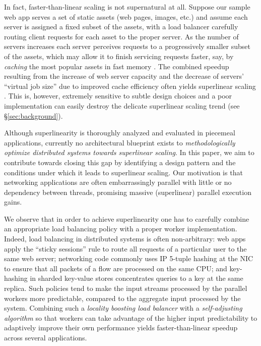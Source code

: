 In fact, faster-than-linear scaling is not supernatural at all. Suppose our sample web app serves a set of static assets (web pages, images, etc.) and assume each server is assigned a fixed subset of the assets, with a load balancer carefully routing client requests for each asset to the proper server. As the number of servers increases each server perceives requests to a progressively smaller subset of the assets, which may allow it to finish servicing requests faster, say, by \emph{caching} the most popular assets in fast memory \cite{10.5555/1012889.1012894, 271208, 10.1145/155332.155358}. The combined speedup resulting from the increase of web server capacity and the decrease of servers' ``virtual job size'' due to improved cache efficiency often yields superlinear scaling \cite{556383, dobb-1, dobb-2, 7733347, 80148, wikipedia, 10.1145/42411.42415, 556383, scalability-analyzed, icsoft20}. This is, however, extremely sensitive to subtle design choices and a poor implementation can easily destroy the delicate superlinear scaling trend (see \S\ref{sec:background}).

Although superlinearity is thoroughly analyzed \cite{dobb-1, dobb-2, 10.1145/2773212.2789974, 556383, 7733347, 80148} and evaluated \cite{scalability-analyzed, sdn-analytitcs, 6483679, 10.1007/978-3-319-77610-1, 10.1145/3627703.3629574, icsoft20} in piecemeal applications, currently no architectural blueprint exists to \emph{methodologically optimize distributed systems towards superlinear scaling}. In this paper, we aim to contribute towards closing this gap by identifying a design pattern and the conditions under which it leads to superlinear scaling.  Our motivation is that networking applications are often embarrassingly parallel with little or no dependency between threads, promising massive (superlinear) parallel execution gains.

We observe that in order to achieve superlinearity one has to carefully combine an appropriate load balancing policy with a proper worker implementation. Indeed, load balancing in distributed systems is often non-arbitrary: web apps apply the ``sticky sessions'' rule to route all requests of a particular user to the same web server; %
networking code commonly uses IP 5-tuple hashing at the NIC to ensure that all packets of a flow are processed on the same CPU; %
and key-hashing in sharded key-value stores concentrates queries to a key at the same replica. Such policies tend to make the input streams processed by the parallel workers more predictable, compared to the aggregate input processed by the system. Combining such a \emph{locality boosting load balancer} with a \emph{self-adjusting algorithm} so that workers can take advantage of the higher input predictability to adaptively improve their own performance yields faster-than-linear speedup across several applications.

